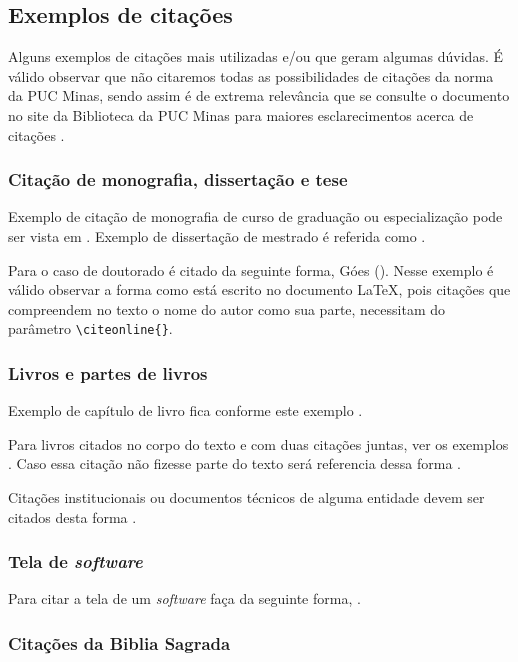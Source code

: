 \subsection{\esp Exemplos de citações} 

Alguns exemplos de citações mais utilizadas e/ou que geram algumas dúvidas. É válido observar que não citaremos
todas as possibilidades de citações da norma da PUC Minas, sendo assim é de extrema relevância que se consulte 
o documento no site da Biblioteca da PUC Minas para maiores esclarecimentos acerca de citações \cite{manualpuc}.

\subsubsection{\esp Citação de monografia, dissertação e tese}

Exemplo de citação de monografia de curso de graduação ou especialização pode ser vista em .
Exemplo de dissertação de mestrado é referida como .

Para o caso de doutorado é citado da seguinte forma, Góes (\citeyear{tese}). Nesse exemplo é válido observar a forma
como está escrito no documento \LaTeX, pois citações que compreendem no texto o nome do autor como sua parte, necessitam 
do parâmetro \verb$\citeonline{}$. 

\subsubsection{\esp Livros e partes de livros}

Exemplo de capítulo de livro fica conforme este exemplo \cite{cap-livro}.

Para livros citados no corpo do texto e com duas citações juntas, ver os exemplos .
Caso essa citação não fizesse parte do texto será referencia dessa forma \cite{knuth,groupp}.

Citações institucionais ou documentos técnicos de alguma entidade devem ser citados desta forma \cite{pmbok}.

\subsubsection{\esp Tela de \textit{software}}

Para  citar a tela de um \textit{\textit{software}} faça da seguinte forma, .

\subsubsection{\esp Citações da Biblia Sagrada}

